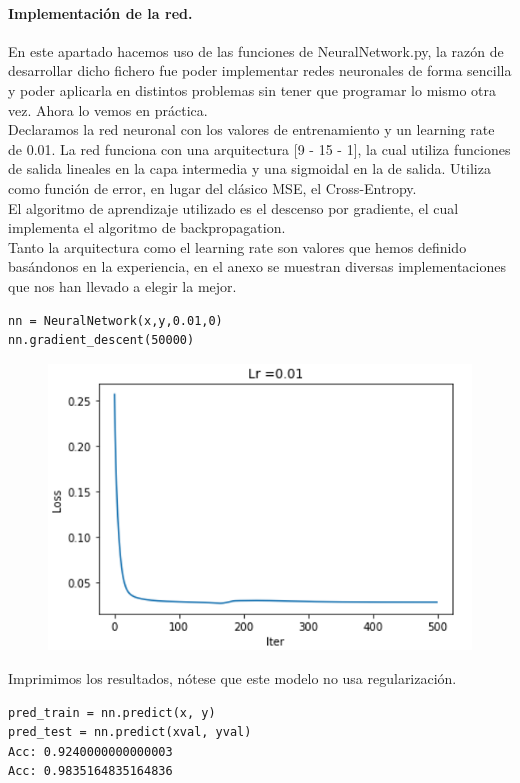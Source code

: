 \documentclass[a4paper,10pt]{article}
\begin{document}
\paragraph{Implementación de la red.}
En este apartado hacemos uso de las funciones de NeuralNetwork.py, la razón de desarrollar dicho fichero fue poder implementar redes neuronales de forma sencilla y poder aplicarla en distintos problemas sin tener que programar lo mismo otra vez. Ahora lo vemos en práctica.\\
Declaramos la red neuronal con los valores de entrenamiento y un learning rate de 0.01. La red funciona con una arquitectura [9 - 15 - 1], la cual utiliza funciones de salida lineales en la capa intermedia y una sigmoidal en la de salida. Utiliza como función de error, en lugar del clásico MSE, el Cross-Entropy. \\El algoritmo de aprendizaje utilizado es el descenso por gradiente, el cual implementa el algoritmo de backpropagation.\\
Tanto la arquitectura como el learning rate son valores que hemos definido basándonos en la experiencia, en el anexo se muestran diversas implementaciones que nos han llevado a elegir la mejor.
\begin{lstlisting}
nn = NeuralNetwork(x,y,0.01,0)
nn.gradient_descent(50000)
\end{lstlisting}
\begin{figure}[H]
\centering
\includegraphics{Annotation 2020-03-23 190119.png}
\end{figure}

Imprimimos los resultados, nótese que este modelo no usa regularización.
\begin{lstlisting}
pred_train = nn.predict(x, y)
pred_test = nn.predict(xval, yval)
Acc: 0.9240000000000003
Acc: 0.9835164835164836
\end{lstlisting}
\end{document}
